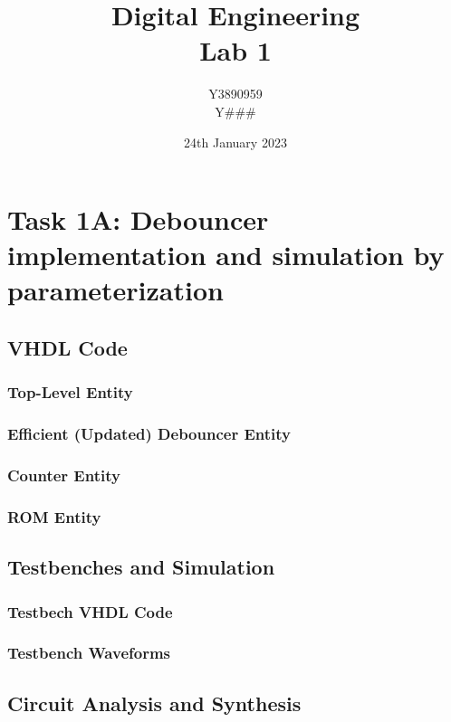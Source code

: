\documentclass[12pt]{article}
\title{Digital Engineering\\Lab 1}
\author{Y3890959\\Y\#\#\#}
\date{24th January 2023}
\begin{document}
\maketitle

\section*{Task 1A: Debouncer implementation and simulation by parameterization}

\subsection*{VHDL Code}

\subsubsection*{Top-Level Entity}

\subsubsection*{Efficient (Updated) Debouncer Entity}

\subsubsection*{Counter Entity}

\subsubsection*{ROM Entity}



\subsection*{Testbenches and Simulation}

\subsubsection*{Testbech VHDL Code}

\subsubsection*{Testbench Waveforms}




\subsection*{Circuit Analysis and Synthesis}
\end{document}
